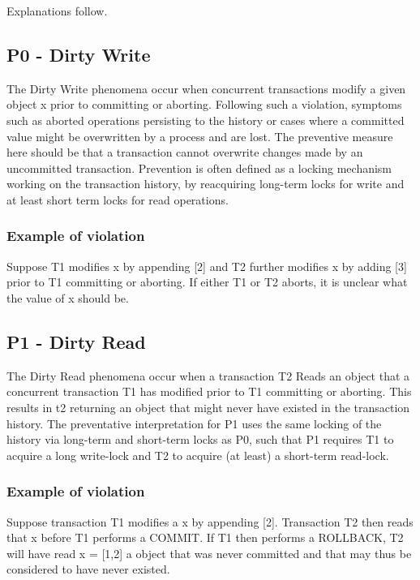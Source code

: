 \documentclass[a4paper,10pt,titlepage]{report}
\begin{document}
Explanations follow.
\subsection{P0 - Dirty Write}
The Dirty Write phenomena occur when concurrent transactions modify a given object x prior to committing or aborting. Following such a violation, symptoms such as aborted operations persisting to the history or cases where a committed value might be overwritten by a process and are lost. The preventive measure here should be that a transaction cannot overwrite changes made by an uncommitted transaction. Prevention is often defined as a locking mechanism working on the transaction history, by reacquiring long-term locks for write and at least short term locks for read operations.\\
\vspace{5mm}
\subsubsection{Example of violation}
Suppose T1 modifies x by appending [2] and T2 further modifies x by adding [3] prior to T1 committing or aborting. If either T1 or T2 aborts, it is unclear what the value of x should be. \\

\vspace{2mm}

\vspace{2mm}

\subsection{P1 - Dirty Read}
The Dirty Read phenomena occur when a transaction T2 Reads an object that a concurrent transaction T1 has modified prior to T1 committing or aborting. This results in t2 returning an object that might never have existed in the transaction history. The preventative interpretation for P1 uses the same locking of the history via long-term and short-term locks as P0, such that P1 requires T1 to acquire a long write-lock and T2 to acquire (at least) a short-term read-lock.

\subsubsection{Example of violation}

Suppose transaction T1 modifies a x by appending [2]. Transaction T2 then reads that x before T1 performs a COMMIT. If T1 then performs a ROLLBACK, T2 will have read x = [1,2] a object that was never committed and that may thus be considered to have never existed.\\
\vspace{2mm}

\vspace{2mm}
\newpage
\end{document}
